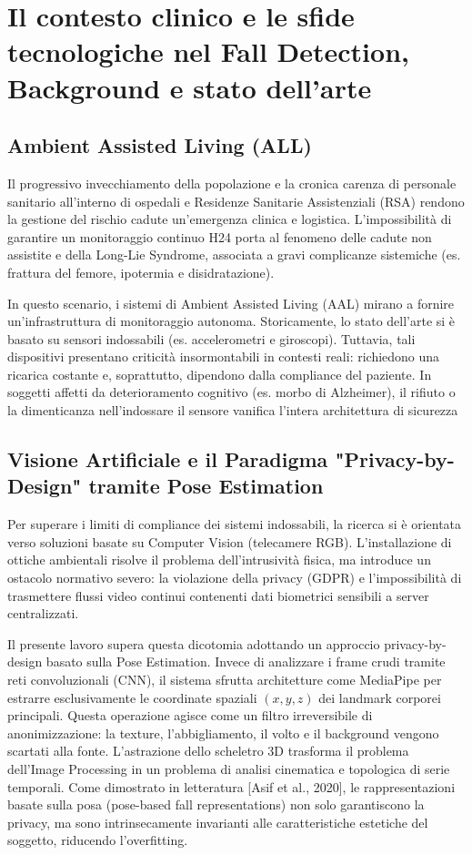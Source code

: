 \chapter{Il contesto clinico e le sfide tecnologiche nel Fall Detection, Background e stato dell'arte}

\section{Ambient Assisted Living (ALL)}
Il progressivo invecchiamento della popolazione e la cronica carenza di personale sanitario all'interno di ospedali e Residenze Sanitarie Assistenziali (RSA) rendono la gestione del rischio cadute un'emergenza clinica e logistica. L'impossibilità di garantire un monitoraggio continuo H24 porta al fenomeno delle cadute non assistite e della Long-Lie Syndrome, associata a gravi complicanze sistemiche (es. frattura del femore, ipotermia e disidratazione).

In questo scenario, i sistemi di Ambient Assisted Living (AAL) mirano a fornire un'infrastruttura di monitoraggio autonoma. Storicamente, lo stato dell'arte si è basato su sensori indossabili (es. accelerometri e giroscopi). Tuttavia, tali dispositivi presentano criticità insormontabili in contesti reali: richiedono una ricarica costante e, soprattutto, dipendono dalla compliance del paziente. In soggetti affetti da deterioramento cognitivo (es. morbo di Alzheimer), il rifiuto o la dimenticanza nell'indossare il sensore vanifica l'intera architettura di sicurezza %

\section{Visione Artificiale e il Paradigma "Privacy-by-Design" tramite Pose Estimation}
Per superare i limiti di compliance dei sistemi indossabili, la ricerca si è orientata verso soluzioni basate su Computer Vision (telecamere RGB). L'installazione di ottiche ambientali risolve il problema dell'intrusività fisica, ma introduce un ostacolo normativo severo: la violazione della privacy (GDPR) e l'impossibilità di trasmettere flussi video continui contenenti dati biometrici sensibili a server centralizzati.

Il presente lavoro supera questa dicotomia adottando un approccio privacy-by-design basato sulla Pose Estimation. Invece di analizzare i frame crudi tramite reti convoluzionali (CNN), il sistema sfrutta architetture come MediaPipe per estrarre esclusivamente le coordinate spaziali $(x,y,z)$ dei landmark corporei principali.
Questa operazione agisce come un filtro irreversibile di anonimizzazione: la texture, l'abbigliamento, il volto e il background vengono scartati alla fonte. L'astrazione dello scheletro 3D trasforma il problema dell'Image Processing in un problema di analisi cinematica e topologica di serie temporali. Come dimostrato in letteratura [Asif et al., 2020], le rappresentazioni basate sulla posa (pose-based fall representations) non solo garantiscono la privacy, ma sono intrinsecamente invarianti alle caratteristiche estetiche del soggetto, riducendo l'overfitting.

